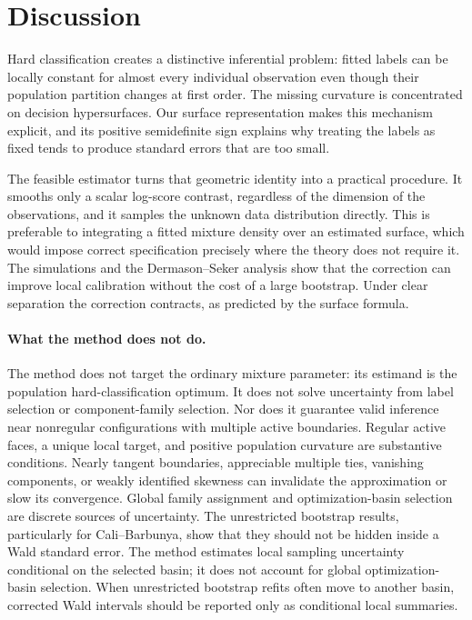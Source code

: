 \documentclass[12pt,a4paper]{article}
\theoremstyle{definition}
\theoremstyle{remark}
\begin{document}
\section{Discussion}
\label{sec:discussion}
Hard classification creates a distinctive inferential problem: fitted labels
can be locally constant for almost every individual observation even though
their population partition changes at first order.  The missing curvature is
concentrated on decision hypersurfaces.  Our surface representation makes this
mechanism explicit, and its positive semidefinite sign explains why treating
the labels as fixed tends to produce standard errors that are too small.

The feasible estimator turns that geometric identity into a practical
procedure.  It smooths only a scalar log-score contrast, regardless of the
dimension of the observations, and it samples the unknown data distribution
directly.  This is preferable to integrating a fitted mixture density over an
estimated surface, which would impose correct specification precisely where
the theory does not require it.  The simulations and the Dermason--Seker
analysis show that the correction can improve local calibration without the
cost of a large bootstrap.  Under clear separation the correction contracts,
as predicted by the surface formula.

\paragraph{What the method does not do.}
The method does not target the ordinary mixture parameter: its estimand is the
population hard-classification optimum.  It does not solve uncertainty from
label selection or component-family selection.  Nor does it guarantee valid
inference near nonregular configurations with multiple active boundaries.
Regular active faces,
a unique local target, and positive population curvature are substantive
conditions.  Nearly tangent boundaries, appreciable multiple ties, vanishing
components, or weakly identified skewness can invalidate the approximation or
slow its convergence.  Global family assignment and optimization-basin
selection are discrete sources of uncertainty.  The unrestricted bootstrap
results, particularly for Cali--Barbunya, show that they should not be hidden
inside a Wald standard error.
The method estimates local sampling uncertainty conditional on the selected
basin; it does not account for global optimization-basin selection.  When
unrestricted bootstrap refits often move to another basin, corrected Wald
intervals should be reported only as conditional local summaries.
\end{document}
